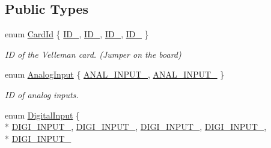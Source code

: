 \subsection*{Public Types}
\begin{DoxyCompactItemize}
\item 
enum \hyperlink{classhbs_1_1_p_v_m110_n_a5716cfee1fa873caf6bf841229c9cb00}{Card\-Id} \{ \hyperlink{classhbs_1_1_p_v_m110_n_a5716cfee1fa873caf6bf841229c9cb00a4b22ef70d42bf7fe27994b8be52a982b}{I\-D\-\_}, 
\hyperlink{classhbs_1_1_p_v_m110_n_a5716cfee1fa873caf6bf841229c9cb00ad2d388fbc7a2a5ea5a8bf302bd771bbe}{I\-D\-\_}, 
\hyperlink{classhbs_1_1_p_v_m110_n_a5716cfee1fa873caf6bf841229c9cb00abbe3a097fa62b02585284693ae2a2139}{I\-D\-\_}, 
\hyperlink{classhbs_1_1_p_v_m110_n_a5716cfee1fa873caf6bf841229c9cb00ab78272ca498ae678e8794c73647358af}{I\-D\-\_}
 \}
\begin{DoxyCompactList}\small\item\em I\-D of the Velleman card. (Jumper on the board) \end{DoxyCompactList}\item 
enum \hyperlink{classhbs_1_1_p_v_m110_n_ace5ddf4b54079516206c07f915c88d97}{Analog\-Input} \{ \hyperlink{classhbs_1_1_p_v_m110_n_ace5ddf4b54079516206c07f915c88d97af452471c02a89a64890f6f6fb17ad63e}{A\-N\-A\-L\-\_\-\-I\-N\-P\-U\-T\-\_}, 
\hyperlink{classhbs_1_1_p_v_m110_n_ace5ddf4b54079516206c07f915c88d97a5e602df3494469d1fd9eaeaf73f6fc66}{A\-N\-A\-L\-\_\-\-I\-N\-P\-U\-T\-\_}
 \}
\begin{DoxyCompactList}\small\item\em I\-D of analog inputs. \end{DoxyCompactList}\item 
enum \hyperlink{classhbs_1_1_p_v_m110_n_aa2574dc931283e208ba911ecd97ac8fa}{Digital\-Input} \{ \\*
\hyperlink{classhbs_1_1_p_v_m110_n_aa2574dc931283e208ba911ecd97ac8faa16764b74046c85195bd696d6df80e05a}{D\-I\-G\-I\-\_\-\-I\-N\-P\-U\-T\-\_}, 
\hyperlink{classhbs_1_1_p_v_m110_n_aa2574dc931283e208ba911ecd97ac8faa399545919832cf58e53af5d7297126ef}{D\-I\-G\-I\-\_\-\-I\-N\-P\-U\-T\-\_}, 
\hyperlink{classhbs_1_1_p_v_m110_n_aa2574dc931283e208ba911ecd97ac8faa01a81e24a7ad5519e7f78848da27e874}{D\-I\-G\-I\-\_\-\-I\-N\-P\-U\-T\-\_}, 
\hyperlink{classhbs_1_1_p_v_m110_n_aa2574dc931283e208ba911ecd97ac8faa11becf8f0eda6486f0c867e6353b1e84}{D\-I\-G\-I\-\_\-\-I\-N\-P\-U\-T\-\_}, 
\\*
\hyperlink{classhbs_1_1_p_v_m110_n_aa2574dc931283e208ba911ecd97ac8faa68079f1bf272f7dd5649610776354c36}{D\-I\-G\-I\-\_\-\-I\-N\-P\-U\-T\-\_}

\end{DoxyCompactItemize}
